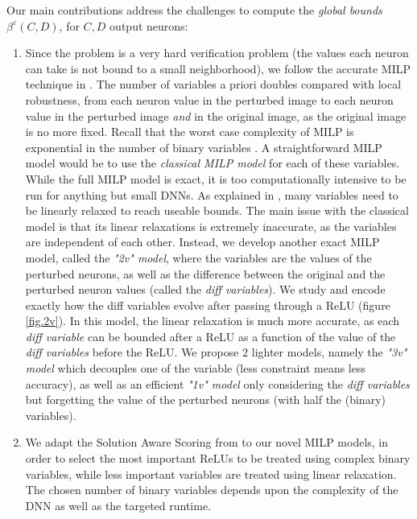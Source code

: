 Our main contributions address the challenges to compute the {\em global bounds} $\beta^\varepsilon(C,D)$, for $C,D$ output neurons:
\begin{enumerate}
	
	\item Since the problem is a very hard verification problem (the values each neuron can take is not bound to a small neighborhood), we follow the accurate MILP technique in \cite{ATVA25}. The number of variables a priori doubles compared with local robustness, from each neuron value in the perturbed image to each neuron value in the perturbed image {\em and} in the original image, as the original image is no more fixed. Recall that the worst case complexity of MILP is exponential in the number of binary variables \cite{DivideAndSlide}. A straightforward MILP model would be to use the {\em classical MILP model} \cite{MILP} for each of these variables. While the full MILP model is exact, it is too computationally intensive to be run for anything but small DNNs. As explained in \cite{ATVA25}, many variables need to be linearly relaxed to reach useable bounds. The main issue with the classical model is that its linear relaxations is extremely inaccurate, as the variables are independent of each other. Instead, we develop another exact MILP model, called the {\em "2v" model}, where the variables are the values of the perturbed neurons, as well as the difference between the original and the perturbed neuron values (called the {\em diff variables}). We study and encode exactly how the diff variables evolve after passing through a ReLU (figure \ref{fig.2v}). In this model, the linear relaxation is much more accurate, as each 
	{\em diff variable} can be bounded 	after a ReLU as a function of the value of the {\em diff variables} before the ReLU. We propose 2 lighter models, namely the {\em "3v" model} which decouples one of the variable (less constraint means less accuracy), as well as an efficient {\em "1v" model} only considering the {\em diff variables} but forgetting the value of the perturbed neurons (with half the (binary) variables).
	
	\item We adapt the Solution Aware Scoring from \cite{ATVA25} to our novel MILP models, in order to select the most important ReLUs to be treated using complex binary variables, while less important variables are treated using linear relaxation. The chosen number of binary variables depends upon the complexity of the DNN as well as the targeted runtime.


\end{enumerate}
